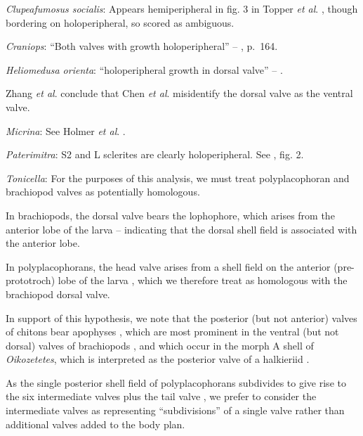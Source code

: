 \documentclass[openany]{book}
\begin{document}
\hypertarget{Clupeafumosus_socialis-coding-90}{}
\emph{Clupeafumosus socialis}: Appears hemiperipheral in fig. 3 in
Topper \emph{et al}. \citeyearpar{Topper2013Reappraisalof}, though
bordering on holoperipheral, so scored as ambiguous.

\hypertarget{Craniops-coding-90}{}
\emph{Craniops}: ``Both valves with growth holoperipheral'' --
\citet{Williams2000LinguliformeaCraniiformea}, p.~164.

\hypertarget{Heliomedusa_orienta-coding-90}{}
\emph{Heliomedusa orienta}: ``holoperipheral growth in dorsal valve'' --
\citet{Williams2007Supplement}.

Zhang \emph{et al}. \citeyearpar{Zhang2009Architectureand} conclude that
Chen \emph{et al}. \citeyearpar{Chen2007Reinterpretationof} misidentify
the dorsal valve as the ventral valve.

\hypertarget{Micrina-coding-90}{}
\emph{Micrina}: See Holmer \emph{et al}.
\citeyearpar{Holmer2008TheEarly}.

\hypertarget{Paterimitra-coding-90}{}
\emph{Paterimitra}: S2 and L sclerites are clearly holoperipheral. See
\citet{Larsson2014iPaterimitra}, fig. 2.

\hypertarget{Tonicella-coding-90}{}
\emph{Tonicella}: For the purposes of this analysis, we must treat
polyplacophoran and brachiopod valves as potentially homologous.

In brachiopods, the dorsal valve bears the lophophore, which arises from
the anterior lobe of the larva \citep{Altenburger2013} -- indicating
that the dorsal shell field is associated with the anterior lobe.

In polyplacophorans, the head valve arises from a shell field on the
anterior (pre-prototroch) lobe of the larva \citep{Wanninger2002C},
which we therefore treat as homologous with the brachiopod dorsal valve.

In support of this hypothesis, we note that the posterior (but not
anterior) valves of chitons bear apophyses
\citep{Schwabe2010, Connors2012}, which are most prominent in the
ventral (but not dorsal) valves of brachiopods \citep[fig.
322]{Williams1997Introduction}, and which occur in the morph A shell of
\emph{Oikozetetes}, which is interpreted as the posterior valve of a
halkieriid \citep{Paterson2009}.

As the single posterior shell field of polyplacophorans subdivides to
give rise to the six intermediate valves plus the tail valve
\citep{Wanninger2002C}, we prefer to consider the intermediate valves as
representing ``subdivisions'' of a single valve rather than additional
valves added to the body plan.
\end{document}
